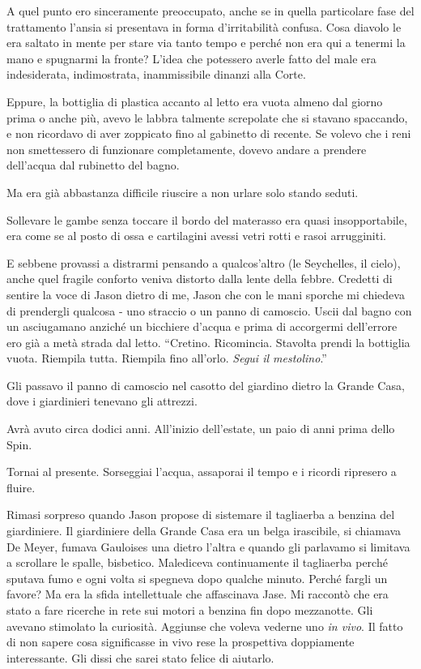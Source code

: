 A quel punto ero sinceramente preoccupato, anche se in quella
particolare fase del trattamento l'ansia si presentava in forma
d'irritabilità confusa. Cosa diavolo le era saltato in mente per stare
via tanto tempo e perché non era qui a tenermi la mano e spugnarmi la
fronte? L'idea che potessero averle fatto del male era indesiderata,
indimostrata, inammissibile dinanzi alla Corte.

Eppure, la bottiglia di plastica accanto al letto era vuota almeno dal
giorno prima o anche più, avevo le labbra talmente screpolate che si
stavano spaccando, e non ricordavo di aver zoppicato fino al gabinetto
di recente. Se volevo che i reni non smettessero di funzionare
completamente, dovevo andare a prendere dell'acqua dal rubinetto del
bagno.

Ma era già abbastanza difficile riuscire a non urlare solo stando
seduti.

Sollevare le gambe senza toccare il bordo del materasso era quasi
insopportabile, era come se al posto di ossa e cartilagini avessi vetri
rotti e rasoi arrugginiti.

E sebbene provassi a distrarmi pensando a qualcos'altro (le Seychelles,
il cielo), anche quel fragile conforto veniva distorto dalla lente della
febbre. Credetti di sentire la voce di Jason dietro di me, Jason che con
le mani sporche mi chiedeva di prendergli qualcosa - uno straccio o un
panno di camoscio. Uscii dal bagno con un asciugamano anziché un
bicchiere d'acqua e prima di accorgermi dell'errore ero già a metà
strada dal letto. ``Cretino. Ricomincia. Stavolta prendi la bottiglia
vuota. Riempila tutta. Riempila fino all'orlo. \emph{Segui il
	mestolino}.''

Gli passavo il panno di camoscio nel casotto del giardino dietro la
Grande Casa, dove i giardinieri tenevano gli attrezzi.

Avrà avuto circa dodici anni. All'inizio dell'estate, un paio di anni
prima dello Spin.

Tornai al presente. Sorseggiai l'acqua, assaporai il tempo e i ricordi
ripresero a fluire.

\separatorefiori

Rimasi sorpreso quando Jason propose di sistemare il tagliaerba a
benzina del giardiniere. Il giardiniere della Grande Casa era un belga
irascibile, si chiamava De Meyer, fumava Gauloises una dietro l'altra e
quando gli parlavamo si limitava a scrollare le spalle, bisbetico.
Malediceva continuamente il tagliaerba perché sputava fumo e ogni volta
si spegneva dopo qualche minuto. Perché fargli un favore? Ma era la
sfida intellettuale che affascinava Jase. Mi raccontò che era stato a
fare ricerche in rete sui motori a benzina fin dopo mezzanotte. Gli
avevano stimolato la curiosità. Aggiunse che voleva vederne uno \emph{in
	vivo}. Il fatto di non sapere cosa significasse in vivo rese la
prospettiva doppiamente interessante. Gli dissi che sarei stato felice
di aiutarlo.


